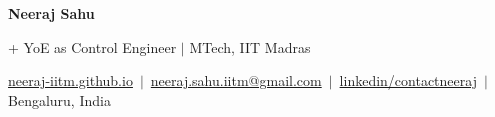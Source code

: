
\begin{center}\vspace{-20pt}
    {\Huge\bfseries\color{NavyBlue} Neeraj Sahu} \\[6pt]
    {+ YoE as Control Engineer $|$ MTech, IIT Madras \par}
    \vspace{4pt}
    {\color{gray}
    \href{https://neeraj-iitm.github.io/}{neeraj-iitm.github.io}
    \,$|$\,
    \href{mailto:neeraj.sahu.iitm@gmail.com}{neeraj.sahu.iitm@gmail.com}
    \,$|$\,
    \href{https://www.linkedin.com/in/contactneeraj/}{linkedin/contactneeraj}
    \,$|$\,
    Bengaluru, India}
\end{center}

